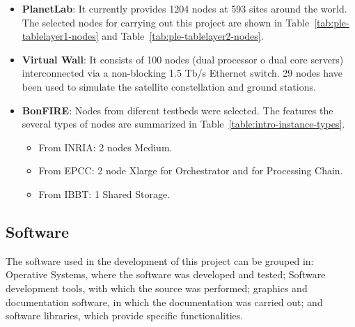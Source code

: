 \begin{itemize}
\item \textbf{PlanetLab}: It currently provides 1204 nodes at 593 sites around
  the world. The selected nodes for carrying out this project are shown in
  Table~\ref{tab:ple-tablelayer1-nodes} and Table~\ref{tab:ple-tablelayer2-nodes}.

\item \textbf{Virtual Wall}: It consists of 100 nodes (dual processor o dual
  core servers) interconnected via a non-blocking 1.5 Tb/s Ethernet switch. 29
  nodes have been used to simulate the satellite constellation and ground
  stations. 

\item \textbf{BonFIRE}: Nodes from diferent testbeds were selected. The
  features the several types of nodes are summarized in Table~\ref{table:intro-instance-types}.
  \begin{itemize}
    \item From INRIA: 2 nodes Medium.
    \item From EPCC: 2 node Xlarge for Orchestrator and for
      Processing Chain.
    \item From IBBT: 1 Shared Storage.

    \end{itemize}
\end{itemize}


\subsection{Software}

The software  used in the development of this project can be grouped in:
Operative Systems, where the software was developed and tested; Software
development tools, with which the source was performed;  graphics and documentation
software, in which the documentation was carried out; and software libraries,
which provide specific functionalities.

